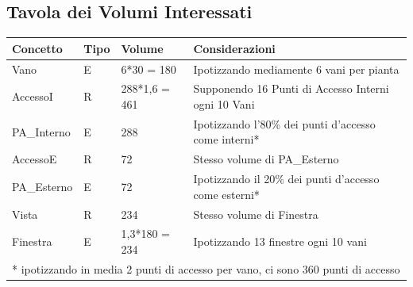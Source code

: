 \documentclass[12pt,a4paper]{report}
\begin{document}
        \subsection{Tavola dei Volumi Interessati}
            \begin{tabular}{|p{4cm}|p{1cm}|p{3cm}|p{8cm}|}
                \hline
                \textbf{Concetto} & \textbf{Tipo} & \textbf{Volume} & \textbf{Considerazioni} \\ \hline
                Vano & E & 6*30 = 180 & Ipotizzando mediamente 6 vani per pianta \\ \hline
                AccessoI & R & 288*1,6 = 461 & Supponendo 16 Punti di Accesso Interni ogni 10 Vani \\ \hline
                PA\_Interno & E & 288 & Ipotizzando l'80\% dei punti d'accesso come interni* \\ \hline
                AccessoE & R & 72 & Stesso volume di PA\_Esterno \\ \hline
                PA\_Esterno & E & 72 & Ipotizzando il 20\% dei punti d'accesso come esterni* \\ \hline
                Vista & R & 234 & Stesso volume di Finestra \\ \hline
                Finestra & E & 1,3*180 = 234 & Ipotizzando 13 finestre ogni 10 vani \\ \hline
                \multicolumn{4}{|l|}{* ipotizzando in media 2 punti di accesso per vano, ci sono 360 punti di accesso} \\ \hline
            \end{tabular}
        
\end{document}
